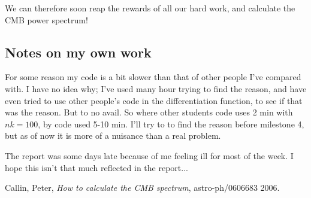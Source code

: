 \documentclass[a4paper,norsk, 10pt]{article}
\begin{document}
We can therefore soon reap the rewards of all our hard work, and calculate the CMB power spectrum!


\subsection{Notes on my own work}
For some reason my code is a bit slower than that of other people I've compared with. I have no idea why; I've used many hour trying to find the reason, and have even tried to use other people's code in the differentiation function, to see if that was the reason. But to no avail. So where other students code uses 2 min with $nk = 100$, by code used 5-10 min. I'll try to to find the reason before milestone 4, but as of now it is more of a nuisance than a real problem.

The report was some days late because of me feeling ill for most of the week. I hope this isn't that much reflected in the report...




\begin{thebibliography}{9}

  Callin, Peter,
  \textit{How to calculate the CMB spectrum},
  astro-ph/0606683
  2006.

\end{thebibliography}
\end{document}

